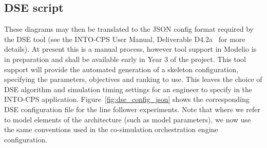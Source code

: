 \subsection{DSE script}


These diagrams may then be translated to the JSON config format required by the DSE tool (see the INTO-CPS User Manual, Deliverable D4.2a~\cite{INTOCPSD4.2a} for more details). At present this is a manual process, however tool support in Modelio is in preparation and shall be available early in Year 3 of the project. This tool support will provide the automated generation of a skeleton configuration, specifying the parameters, objectives and ranking to use. This leaves the choice of DSE algorithm and simulation timing settings for an engineer to specify in the INTO-CPS application.
Figure~\ref{fig:dse_config_json} shows the corresponding DSE configuration file for the line follower experiments. Note that where we refer to model elements of the architecture (such as model parameters), we now use the same conventions used in the co-simulation orchestration engine configuration.


